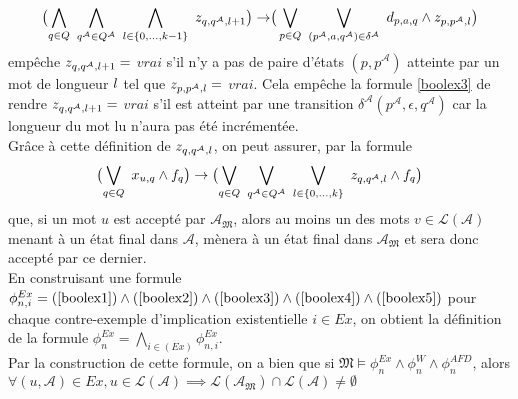 \documentclass[12pt,a4paper,oneside,titlepage]{report}
\begin{document}
\begin{equation}
\label{boolex4}
\begin{aligned}
\bigl ( \bigwedge_{q\in Q}~ \bigwedge_{q^\mathcal{A}\in Q^\mathcal{A}}~ \bigwedge_{\mathnormal{l}\in\{0,... ,k-1\}}~ z_{q,q^\mathcal{A},\mathnormal{l}+1} \bigr ) \rightarrow \bigr ( \bigvee_{p\in Q}~ \bigvee_{(p^\mathcal{A},a,q^\mathcal{A})\in\delta^\mathcal{A}}~ d_{p,a,q}\land z_{p,p^\mathcal{A},\mathnormal{l}} \bigr )
\end{aligned}
\end{equation}
empêche $z_{q,q^\mathcal{A},\mathnormal{l}+1}=$ $vrai$ s'il n'y a pas de paire d'états $(p,p^\mathcal{A})$ atteinte par un mot de longueur $\mathnormal{l}$ tel que $z_{p,p^\mathcal{A},\mathnormal{l}}=$ $vrai$. Cela empêche la formule \ref{boolex3} de rendre $z_{q,q^\mathcal{A},\mathnormal{l}+1}=$ $vrai$ s'il est atteint par une transition $\delta^\mathcal{A}(p^\mathcal{A},\epsilon,q^\mathcal{A})$ car la longueur du mot lu n'aura pas été incrémentée.\\

\noindent Grâce à cette définition de $z_{q,q^\mathcal{A},\mathnormal{l}}$, on peut assurer, par la formule
\begin{equation}
\label{boolex5}
\begin{aligned}
\bigl ( \bigvee_{q\in Q}~ x_{u,q}\land f_q \bigr ) \rightarrow \bigl ( \bigvee_{q\in Q}~ \bigvee_{q^\mathcal{A}\in Q^\mathcal{A}}~ \bigvee_{\mathnormal{l}\in\{0,...,k\}}~ z_{q,q^\mathcal{A},\mathnormal{l}}\land f_q \bigr )
\end{aligned}
\end{equation}
que, si un mot $u$ est accepté par $\mathcal{A}_\mathfrak{M}$, alors au moins un des mots $v\in\mathcal{L}(\mathcal{A})$ menant à un état final dans $\mathcal{A}$, mènera à un état final dans $\mathcal{A}_\mathfrak{M}$ et sera donc accepté par ce dernier.\\

\noindent En construisant une formule $\phi_{n,i}^{Ex}=(\ref{boolex1})\land(\ref{boolex2})\land(\ref{boolex3})\land(\ref{boolex4})\land(\ref{boolex5})$ pour chaque contre-exemple d'implication existentielle $i\in Ex$, on obtient la définition de la formule $\phi^{Ex}_n=\bigwedge_{i\in(Ex)}\phi_{n,i}^{Ex}$.\\
Par la construction de cette formule, on a bien que si $\mathfrak{M}\models\phi_n^{Ex}\land\phi^{W}_n\land\phi^{AFD}_n$, alors $\forall(u,\mathcal{A})\in Ex, u\in\mathcal{L}(\mathcal{A})\implies \mathcal{L}(\mathcal{A}_\mathfrak{M})\cap\mathcal{L}(\mathcal{A})\neq\emptyset$\\
\end{document}
